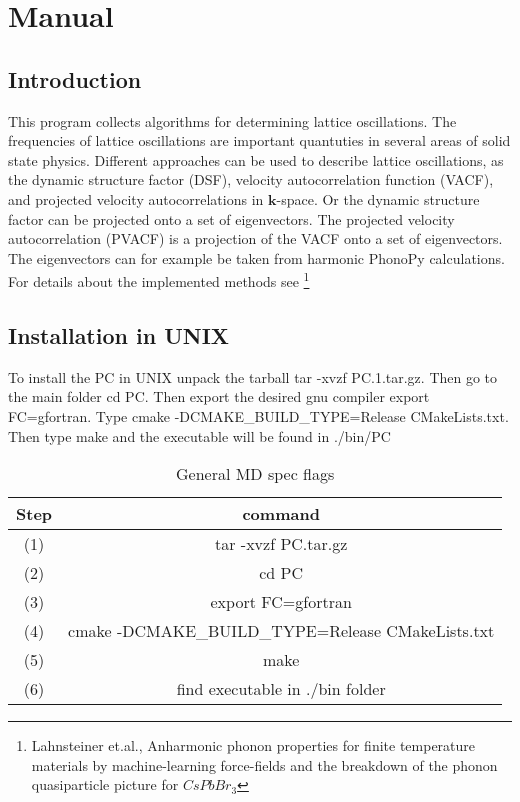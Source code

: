 \documentclass[a4paper,12pt]{article}
\begin{document}
\pagestyle{fancy}



\section{Manual}
\subsection{Introduction}
This program collects algorithms for determining lattice oscillations.
The frequencies of lattice oscillations are important quantuties
in several areas of solid state physics.
Different approaches can be used to describe lattice oscillations, as
the dynamic structure factor (DSF), velocity autocorrelation function
(VACF), and projected velocity autocorrelations in $\mathbf{k}$-space.
Or the dynamic structure factor can be projected onto a set of
eigenvectors. The projected velocity autocorrelation (PVACF) is a projection
of the VACF onto a set of eigenvectors. The eigenvectors can for example
be taken from harmonic PhonoPy calculations.
For details about the implemented methods see \footnote[1]{Lahnsteiner et.al.,
Anharmonic phonon properties for finite temperature materials by
machine-learning force-fields and the breakdown
of the phonon quasiparticle picture for $\textit{CsPbBr}_{3}$}




\subsection{Installation in UNIX}
To install the PC in UNIX unpack the tarball
tar -xvzf PC.1.tar.gz. Then go to the main folder
cd PC. Then export the desired gnu compiler
export FC=gfortran. Type cmake -DCMAKE\_BUILD\_TYPE=Release CMakeLists.txt.
Then type make and the executable will be found in ./bin/PC

\begin{table}[h!]
	\centering
	\caption{General MD spec flags}
\begin{tabular}{ |c|c| }
 \hline
	Step & command \\ 
 \hline
	(1) & tar -xvzf PC.tar.gz \\  
	(2) & cd PC \\
	(3) & export FC=gfortran \\
	(4) & cmake -DCMAKE\_BUILD\_TYPE=Release CMakeLists.txt \\
	(5) & make \\
	(6) & find executable in ./bin folder \\
 \hline
\end{tabular}
\end{table}
\end{document}

